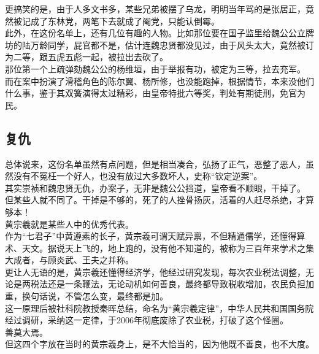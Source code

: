 \begin{multicols}{\theparacolNo}
更搞笑的是，由于人多文书多，某些兄弟被摆了乌龙，明明当年骂的是张居正，竟然被记成了东林党，两笔下去就成了阉党，只能认倒霉。\\

此外，在这份名单上，还有几位有趣的人物。比如那位要在国子监里给魏公公立牌坊的陆万龄同学，屁官都不是，估计连魏忠贤都没见过，由于风头太大，竟然被订为二等，跟五虎五彪一起，被拉出去砍了。\\

那位第一个上疏弹劾魏公公的杨维垣，由于举报有功，被定为三等，拉去充军。\\

而在案中扮演了滑稽角色的陈尔翼、杨所修，也没能跑掉，根据情节，本来没他们什么事，鉴于其双簧演得太过精彩，由皇帝特批六等奖，判处有期徒刑，免官为民。\\

\subsection{复仇}
总体说来，这份名单虽然有点问题，但是相当凑合，弘扬了正气，恶整了恶人，虽然没有不冤枉一个好人，也没有放过大多数坏人，史称“钦定逆案”。\\

其实崇祯和魏忠贤无仇，办案子，无非是魏公公挡道，皇帝看不顺眼，干掉了。\\

但某些人就不同了。干掉是不够的，死了的人挫骨扬灰，活着的人赶尽杀绝，才算够本！\\

黄宗羲就是某些人中的优秀代表。\\

作为“七君子”中黄遵素的长子，黄宗羲可谓天赋异禀，不但精通儒学，还懂得算术、天文。据说天上飞的，地上跑的，没有他不知道的，被称为三百年来学术之集大成者，与顾炎武、王夫之并称。\\

更让人无语的是，黄宗羲还懂得经济学，他经过研究发现，每次农业税法调整，无论是两税法还是一条鞭法，无论动机如何善良，最终都导致税收增加，农民负担加重，换句话说，不管怎么变，最终都是加。\\

这一原理后被社科院教授秦晖总结，命名为“黄宗羲定律”，中华人民共和国国务院经过调研，采纳这一定律，于2006年彻底废除了农业税，打破了这个怪圈。\\

善莫大焉。\\

但这四个字放在当时的黄宗羲身上，是不大恰当的，因为他既不善良，也不大度。\\


\end{multicols}
